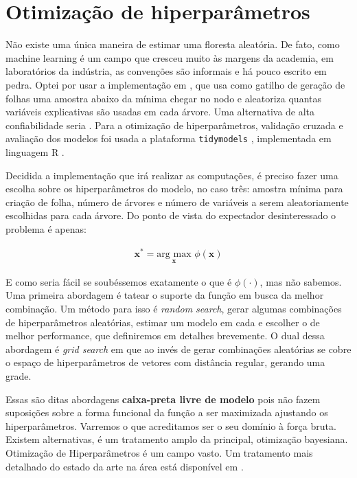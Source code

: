 \section{Otimização de hiperparâmetros}

Não existe uma única maneira de estimar uma floresta aleatória. De fato, como machine learning é um campo que cresceu muito às margens da academia, em laboratórios da indústria, as convenções são informais e há pouco escrito em pedra. Optei por usar a implementação em , que usa como gatilho de geração de folhas uma amostra abaixo da mínima chegar no nodo e aleatoriza quantas variáveis explicativas são usadas em cada árvore. Uma alternativa de alta confiabilidade seria . Para a otimização de hiperparâmetros, validação cruzada e avaliação dos modelos foi usada a plataforma \texttt{tidymodels} \cite{tidymodels}, implementada em linguagem R \cite{R}.

Decidida a implementação que irá realizar as computações, é preciso fazer uma escolha sobre os hiperparâmetros do modelo, no caso três: amostra mínima para criação de folha, número de árvores e número de variáveis a serem aleatoriamente escolhidas para cada árvore. Do ponto de vista do expectador desinteressado o problema é apenas:

\begin{align}
    \mathbf{x}^* = \underset{\mathbf{x}}{\text{arg max}} \,\,\phi(\mathbf{x}) 
\end{align}

E como seria fácil se soubéssemos exatamente o que é $\phi(\cdot)$, mas não sabemos. Uma primeira abordagem é tatear o suporte da função em busca da melhor combinação. Um método para isso é \textit{random search}, gerar algumas combinações de hiperparâmetros aleatórias, estimar um modelo em cada e escolher o de melhor performance, que definiremos em detalhes brevemente. O dual dessa abordagem é \textit{grid search} em que ao invés de gerar combinações aleatórias se cobre o espaço de hiperparâmetros de vetores com distância regular, gerando uma grade. 

Essas são ditas abordagens \textbf{caixa-preta livre de modelo} pois não fazem suposições sobre a forma funcional da função a ser maximizada ajustando os hiperparâmetros. Varremos o que acreditamos ser o seu domínio à força bruta. Existem alternativas,  é um tratamento amplo da principal, otimização bayesiana. Otimização de Hiperparâmetros é um campo vasto. Um tratamento mais detalhado do estado da arte na área está disponível em .


